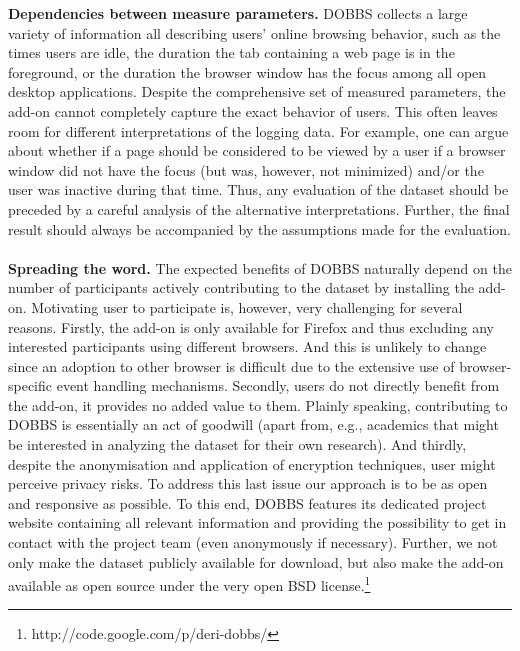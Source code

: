 \documentclass[11pt,fleqn,twoside]{article}
\begin{document}
\textbf{Dependencies between measure parameters.}
DOBBS collects a large variety of information all describing users' online browsing behavior, such as the times users are idle, the duration the tab containing a web page is in the foreground, or the duration the browser window has the focus among all open desktop applications. Despite the comprehensive set of measured parameters, the add-on cannot completely capture the exact behavior of users. This often leaves room for different interpretations of the logging data. For example, one can argue about whether if a page should be considered to be viewed by a user if a browser window did not have the focus (but was, however, not minimized) and/or the user was inactive during that time. Thus, any evaluation of the dataset should be preceded by a careful analysis of the alternative interpretations. Further, the final result should always be accompanied by the assumptions made for the evaluation.
\\
\\
\textbf{Spreading the word.}
The expected benefits of DOBBS naturally depend on the number of participants actively contributing to the dataset by installing the add-on. Motivating user to participate is, however, very challenging for several reasons. Firstly, the add-on is only available for Firefox and thus excluding any interested participants using different browsers. And this is unlikely to change since an adoption to other browser is difficult due to the extensive use of browser-specific event handling mechanisms. Secondly, users do not directly benefit from the add-on, it provides no added value to them. Plainly speaking, contributing to DOBBS is essentially an act of goodwill (apart from, e.g., academics that might be interested in analyzing the dataset for their own research). And thirdly, despite the anonymisation and application of encryption techniques, user might perceive privacy risks. To address this last issue our approach is to be as open and responsive as possible. To this end, DOBBS features its dedicated project 
website containing all relevant information and providing the possibility to get in contact with the project team (even anonymously if necessary). Further, we not only make the dataset publicly available for download, but also make the add-on available as open source under the very open BSD license.\footnote{http://code.google.com/p/deri-dobbs/}
\end{document}
